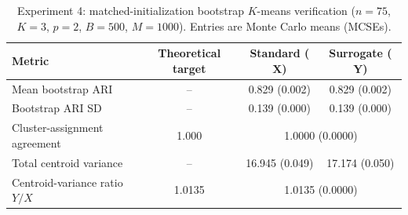 \begin{table}[htbp]
\centering
\small
\caption{Experiment 4: matched-initialization bootstrap $K$-means verification ($n=75$, $K=3$, $p=2$, $B=500$, $M=1000$). Entries are Monte Carlo means (MCSEs).}
\label{tab:exp4results}
\begin{tabular}{lccc}
\hline\hline
\textbf{Metric} & \textbf{Theoretical target} & \textbf{Standard ($\mathbf{X}$)} & \textbf{Surrogate ($\mathbf{Y}$)} \\
\hline
Mean bootstrap ARI & -- & 0.829 (0.002) & 0.829 (0.002) \\
Bootstrap ARI SD & -- & 0.139 (0.000) & 0.139 (0.000) \\
Cluster-assignment agreement & 1.000 & \multicolumn{2}{c}{1.0000 (0.0000)} \\
Total centroid variance & -- & 16.945 (0.049) & 17.174 (0.050) \\
Centroid-variance ratio $Y/X$ & 1.0135 & \multicolumn{2}{c}{1.0135 (0.0000)} \\
\hline\hline
\end{tabular}
\end{table}
